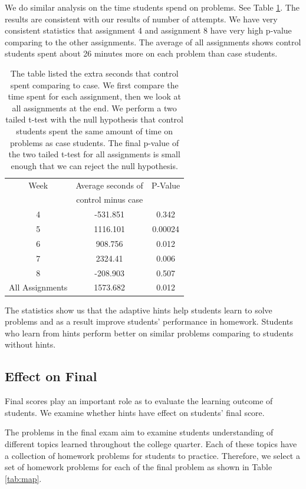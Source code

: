 \documentclass{llncs}
\begin{document}
We do similar analysis on the time students spend on problems. See Table \ref{tab:no_hint_time}. The results are consistent with our results of number of attempts. We have very consistent statistics that assignment 4 and assignment 8 have very high p-value comparing to the other assignments. The average of all assignments shows control students spent about 26 minutes more on each problem than case students.

\begin{table}
\caption{The table listed the extra seconds that control spent comparing to case. We first compare the time spent for each assignment, then we look at all assignments at the end. We perform a two tailed t-test with the null hypothesis that control students spent the same amount of time on problems as case students. The final p-value of the two tailed t-test for all assignments is small enough that we can reject the null hypothesis.}
\begin{center}
  \begin{tabular}{| c | c | c |}
  \hline
   Week & Average seconds of & P-Value \\
      & control minus case  & \\ \hline
	4 & -531.851 & 0.342 \\
	5 & 1116.101 & 0.00024 \\
	6 & 908.756 & 0.012 \\
	7 & 2324.41 & 0.006 \\
	8 & -208.903 & 0.507 \\ \hline
    All Assignments & 1573.682 & 0.012 \\ 
    \hline
  \end{tabular}
  \label{tab:no_hint_time}
  \end{center}
\end{table}

The statistics show us that the adaptive hints help students learn to solve problems and as a result improve students' performance in homework. Students who learn from hints perform better on similar problems comparing to students without hints.

\subsection{Effect on Final}
Final scores play an important role as to evaluate the learning outcome of students. We examine whether hints have effect on students' final score.

The problems in the final exam aim to examine students understanding of different topics learned throughout the college quarter. Each of these topics have a collection of homework problems for students to practice. Therefore, we select a set of homework problems for each of the final problem as shown in Table \ref{tab:map}.
\end{document}
